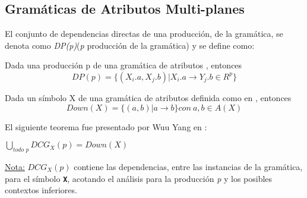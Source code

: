 \documentclass[runningheads,a4paper]{llncs}
\newcommand{\textbtt}[1]{\texttt{\textbf{#1}}}
\newcommand{\maggen}{\textbf{magGen}}
\begin{document}

% 
% 

\subsection{Gramáticas de Atributos Multi-planes}
\label{def:MAG}

El conjunto de dependencias directas de una producción, de la gramática, se denota como \textit{DP(p)}(\textit{p} producción de la gramática) y se define como:
\begin{definition}
Dada una producción p de una gramática de atributos 
, entonces
\begin{equation}
DP(p) = \{(X_{i}.a, X_{j}.b) | X_{i}.a \rightarrow Y_{j}.b \in R^{p} \}
\end{equation}
\end{definition}


\begin{definition}
Dada un símbolo X de una gramática de atributos definida como en 
, entonces
\begin{equation}
Down(X) = \{(a,b) | a \rightarrow b \} con\ a,b \in A(X)
\end{equation}
\end{definition}

El siguiente teorema fue presentado por Wuu Yang en \cite{wuu-yang1}:
\begin{theorem}
$\bigcup\limits_{\textit{todo p}}{DCG_{X} (p) = Down (X)}$
\end{theorem}
\underline{Nota:} $DCG_{X}(p)$ contiene las dependencias, entre las instancias de la gramática, para el símbolo \textbtt{X}, acotando el análisis para la producción \textit{p} y los posibles contextos inferiores.
\end{document}
